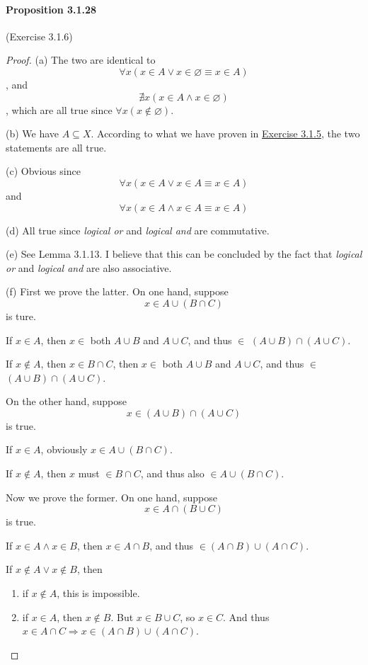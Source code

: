 \paragraph{Proposition 3.1.28} (Exercise 3.1.6) \label{exercise3.1.6}
\begin{proof}
(a) The two are identical to 
\[
\forall x(x \in A \vee x \in \varnothing \equiv x \in A)
\], 
and 
\[
\nexists x(x \in A \wedge x \in \varnothing)
\], 
which are all true since $\forall x(x \notin \varnothing)$.

(b) We have $A \subseteq X$. According to what we have proven in 
\hyperref[exercise3.1.5]{Exercise 3.1.5}, the two statements are all true.

(c) Obvious since 
\[
\forall x(x \in A \vee x \in A \equiv x \in A)
\]
and 
\[
\forall x(x \in A \wedge x \in A \equiv x \in A)
\]

(d) All true since \emph{logical or} and \emph{logical and} are commutative.

(e) See Lemma 3.1.13. I believe that this can be concluded by the fact that \emph{logical or} and 
\emph{logical and} are also associative.

(f) 
First we prove the latter. On one hand, suppose 
\[
x \in A \cup (B \cap C)
\] is ture.

If $x \in A$, then $x \in$ both $A \cup B$ and $A \cup C$, and thus $\in$ 
$(A \cup B)\cap(A \cup C)$.

If $x \notin A$, then $x \in B \cap C$, then $x \in$ both $A \cup B$ and $A \cup C$, and thus $\in$ 
$(A \cup B)\cap(A \cup C)$.

On the other hand, 
suppose 
\[
x \in (A \cup B)\cap(A \cup C)
\] is true.

If $x \in A$, obviously $x \in A \cup (B \cap C)$.

If $x \notin A$, then $x$ must $\in B \cap C$, and thus also $\in A \cup (B \cap C)$.

Now we prove the former. On one hand, suppose
\[
x \in A \cap (B \cup C)
\] is true.

If $x \in A \wedge x \in B$, then $x \in A \cap B$, and thus $\in (A \cap B)\cup(A \cap C)$.

If $x \notin A \vee x \notin B$, then
\begin{enumerate}
\item if $x \notin A$, this is impossible.
\item if $x \in A$, then $x \notin B$. But $x \in B \cup C$, so $x \in C$. And thus 
$x \in A \cap C \Rightarrow x \in (A \cap B)\cup(A \cap C)$.
\end{enumerate}


\end{proof}
